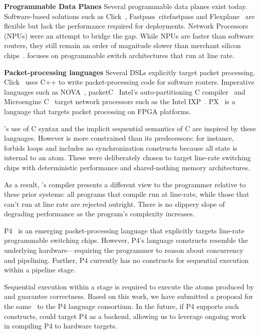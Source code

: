 \textbf{Programmable Data Planes}
Several programmable data planes exist today. Software-based solutions such as
Click~\cite{click}, Fastpass~cite{fastpass} and Flexplane~\cite{flexplane} are
flexible but lack the performance required for deployments. Network
Processors~\cite{intel, ixp2800, ixp} (NPUs) were an attempt to bridge the gap.
While NPUs are faster than software routers, they still remain an order of
magnitude slower than merchant silicon chips~\cite{rmt}. \pktlanguage focuses on
programmable switch architectures that run at line rate.

\textbf{Packet-processing languages}
Several DSLs explicitly target packet processing. Click~\cite{click} uses C++
to write packet-processing code for software routers. Imperative languages such
as NOVA~\cite{nova}, packetC~\cite{packetc} Intel's auto-partitioning C
compiler~\cite{intel_uiuc_pldi} and Microengine C~\cite{microenginec,
intel_ixa} target network processors such as the Intel IXP~\cite{ixp2800, ixp}.
PX~\cite{PX} is a language that targets packet processing on FPGA platforms.

\pktlanguage's use of C syntax and the implicit sequential semantics of C are
inspired by these languages. However \pktlanguage is more constrained than its
predecessors: for instance, \pktlanguage forbids loops and includes no
synchronization constructs because all state is internal to an atom. These were
deliberately chosen to target line-rate switching chips with deterministic
performance and shared-nothing memory architectures.

As a result, \pktlanguage's compiler presents a different view to the
programmer relative to these prior systems: all \pktlanguage programs that
compile run at line-rate, while those that can't run at line rate are rejected
outright. There is no slippery slope of degrading performance as the program's
complexity increases.

P4~\cite{p4} is an emerging packet-processing language that explicitly targets
line-rate programmable switching chips. However, P4's language constructs
resemble the underlying hardware---requiring the programmer to reason about
concurrency and pipelining. Further, P4 currently has no constructs for
sequential execution within a pipeline stage.

Sequential execution within a stage is required to execute the atoms produced
by \pktlanguage and guarantee correctness. Based on this work, we have
submitted a proposal for the same~\cite{p4-semantics} to the P4 language
consortium. In the future, if P4 supports such constructs, \pktlanguage could
target P4 as a backend, allowing us to leverage ongoing work ~\cite{netronome,
xilinx,lavanya_compiler} in compiling P4 to hardware targets.

